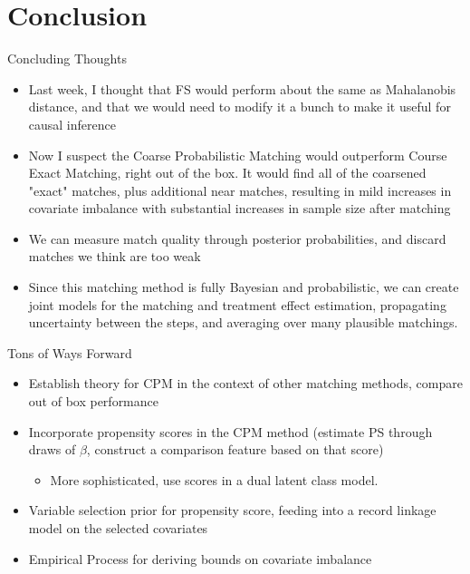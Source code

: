 \documentclass{beamer}
\begin{document}
\section{Conclusion}
\begin{frame}{Concluding Thoughts}
	\begin{itemize}
		\item Last week, I thought that FS would perform about the same as Mahalanobis distance, and that we would need to modify it a bunch to make it useful for causal inference
		\item Now I suspect the Coarse Probabilistic Matching would outperform Course Exact Matching, right out of the box. It would find all of the coarsened "exact" matches, plus additional near matches, resulting in mild increases in covariate imbalance with substantial increases in sample size after matching
		\item We can measure match quality through posterior probabilities, and discard matches we think are too weak
		\item Since this matching method is fully Bayesian and probabilistic, we can create joint models for the matching and treatment effect estimation, propagating uncertainty between the steps, and averaging over many plausible matchings.
	\end{itemize}
\end{frame}

\begin{frame}{Tons of Ways Forward}
	\begin{itemize}
		\item Establish theory for CPM in the context of other matching methods, compare out of box performance
		\item Incorporate propensity scores in the CPM method (estimate PS through draws of $\beta$, construct a comparison feature based on that score)
		\begin{itemize}
			\item More sophisticated, use scores in a dual latent class model. 
		\end{itemize}
		\item Variable selection prior for propensity score, feeding into a record linkage model on the selected covariates
		\item Empirical Process for deriving bounds on covariate imbalance
	\end{itemize}
\end{frame}
\end{document}
